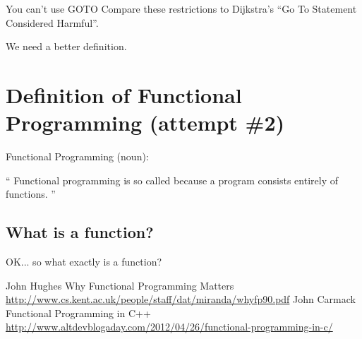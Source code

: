 \documentclass{beamer}
\begin{document}
\begin{frame}{You can't use GOTO}
Compare these restrictions to Dijkstra's
``Go To Statement Considered Harmful''.
\end{frame}

\begin{frame}{}
We need a better definition.
\end{frame}

\section{Definition of Functional Programming (attempt \#2)}

\begin{frame}{Functional Programming (noun):}

\begin{exampleblock}{}
  {\large ``
  Functional programming is so called because a program consists entirely of functions.
  ''}
  \vskip5mm
  \hspace*{}
\end{exampleblock}
\end{frame}

\subsection{What is a function?}
\begin{frame}{}
OK... so what exactly is a function?
\end{frame}

\begin{frame}[allowframebreaks]
  \begin{thebibliography}{10}
      John Hughes
      \newblock Why Functional Programming Matters
      \newblock \url{http://www.cs.kent.ac.uk/people/staff/dat/miranda/whyfp90.pdf}
      John Carmack
      \newblock Functional Programming in C++
      \newblock \url{http://www.altdevblogaday.com/2012/04/26/functional-programming-in-c/}
  \end{thebibliography}
\end{frame}
\end{document}
